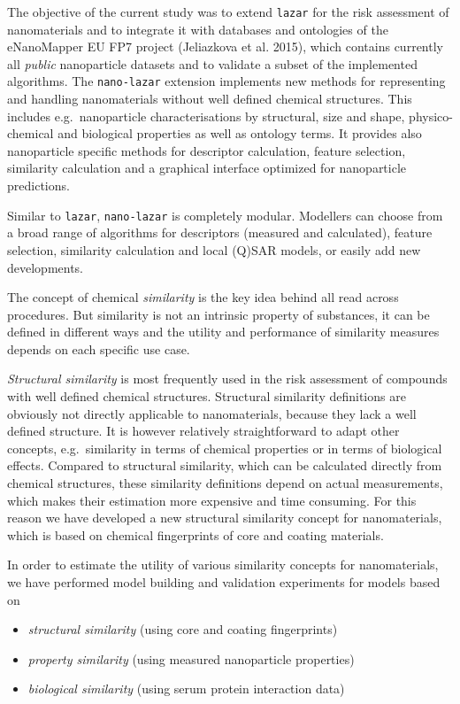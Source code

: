 \documentclass[utf8]{frontiersHLTH} %
\providecommand{\tightlist}{%
  \setlength{\itemsep}{0pt}\setlength{\parskip}{0pt}}
\begin{document}
The objective of the current study was to extend \texttt{lazar} for the
risk assessment of nanomaterials and to integrate it with databases and
ontologies of the eNanoMapper EU FP7 project (Jeliazkova et al. 2015),
which contains currently all \emph{public} nanoparticle datasets and to
validate a subset of the implemented algorithms. The \texttt{nano-lazar}
extension implements new methods for representing and handling
nanomaterials without well defined chemical structures. This includes
e.g.~nanoparticle characterisations by structural, size and shape,
physico-chemical and biological properties as well as ontology terms. It
provides also nanoparticle specific methods for descriptor calculation,
feature selection, similarity calculation and a graphical interface
optimized for nanoparticle predictions.

Similar to \texttt{lazar}, \texttt{nano-lazar} is completely modular.
Modellers can choose from a broad range of algorithms for descriptors
(measured and calculated), feature selection, similarity calculation and
local (Q)SAR models, or easily add new developments.

The concept of chemical \emph{similarity} is the key idea behind all
read across procedures. But similarity is not an intrinsic property of
substances, it can be defined in different ways and the utility and
performance of similarity measures depends on each specific use case.

\emph{Structural similarity} is most frequently used in the risk
assessment of compounds with well defined chemical structures.
Structural similarity definitions are obviously not directly applicable
to nanomaterials, because they lack a well defined structure. It is
however relatively straightforward to adapt other concepts,
e.g.~similarity in terms of chemical properties or in terms of
biological effects. Compared to structural similarity, which can be
calculated directly from chemical structures, these similarity
definitions depend on actual measurements, which makes their estimation
more expensive and time consuming. For this reason we have developed a
new structural similarity concept for nanomaterials, which is based on
chemical fingerprints of core and coating materials.

In order to estimate the utility of various similarity concepts for
nanomaterials, we have performed model building and validation
experiments for models based on

\begin{itemize}
\tightlist
\item
  \emph{structural similarity} (using core and coating fingerprints)
\item
  \emph{property similarity} (using measured nanoparticle properties)
\item
  \emph{biological similarity} (using serum protein interaction data)
\end{itemize}
\end{document}
